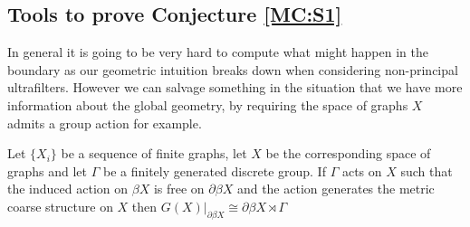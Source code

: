 \subsection{Tools to prove Conjecture \ref{MC:S1}}
In general it is going to be very hard to compute what might happen in the boundary as our geometric intuition breaks down when considering non-principal ultrafilters. However we can salvage something in the situation that we have more information about the global geometry, by requiring the space of graphs $X$ admits a group action for example.

\begin{proposition}\label{Prop:Crit}
Let $\lbrace X_{i} \rbrace$ be a sequence of finite graphs, let $X$ be the corresponding space of graphs and let $\Gamma$ be a finitely generated discrete group. If $\Gamma$ acts on $X$ such that the induced action on $\beta X$ is free on $\partial \beta X$ and the action generates the metric coarse structure on $X$ then $G(X)|_{\partial \beta X} \cong \partial \beta X \rtimes \Gamma$
\end{proposition}
